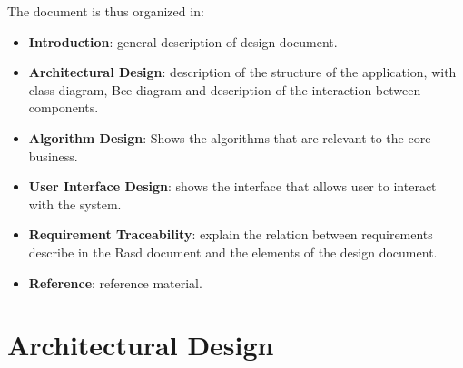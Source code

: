 \documentclass[11pt, a4paper,titlepage]{article}
\begin{document}
The document is thus organized in:
\begin{itemize}
	\item \textbf{Introduction}: general description of design document.
	\item \textbf{Architectural Design}: description of the structure of the application, with class diagram, Bce diagram and description of the interaction between components.
	\item \textbf{Algorithm Design}: Shows the algorithms that are relevant to the core business.
	\item \textbf{ User Interface Design}: shows the interface that allows user to interact with the system.
	\item \textbf{Requirement Traceability}: explain the relation between requirements describe in the Rasd document and the elements of the design document.
	\item \textbf{Reference}: reference material.
\end{itemize}



\section{Architectural Design}
\end{document}
